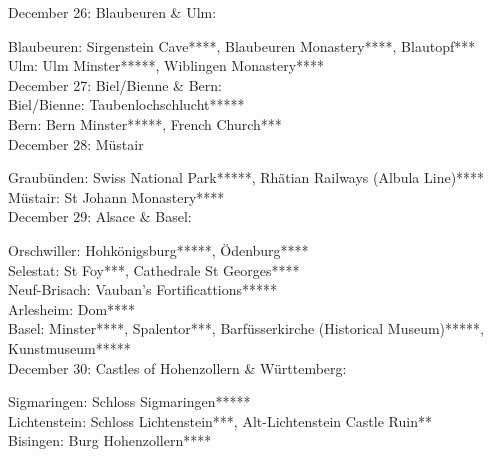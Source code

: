December 26: Blaubeuren \& Ulm:

Blaubeuren: Sirgenstein Cave****, Blaubeuren Monastery****, Blautopf***\\
Ulm: Ulm Minster*****, Wiblingen Monastery****\\


December 27: Biel/Bienne \& Bern:\\

Biel/Bienne: Taubenlochschlucht*****\\
Bern: Bern Minster*****, French Church***\\

December 28: M\"ustair

Graub\"unden: Swiss National Park*****, Rh\"atian Railways (Albula Line)****\\
M\"ustair: St Johann Monastery****\\

December 29: Alsace \& Basel:

Orschwiller: Hohk\"onigsburg*****, \"Odenburg****\\
Selestat: St Foy***, Cathedrale St Georges****\\
Neuf-Brisach: Vauban's Fortificattions*****\\
Arlesheim: Dom****\\
Basel: Minster****, Spalentor***, Barf\"usserkirche (Historical Museum)*****, Kunstmuseum*****\\

December 30: Castles of Hohenzollern \& W\"urttemberg:

Sigmaringen: Schloss Sigmaringen*****\\
Lichtenstein: Schloss Lichtenstein***, Alt-Lichtenstein Castle Ruin**\\
Bisingen: Burg Hohenzollern****




